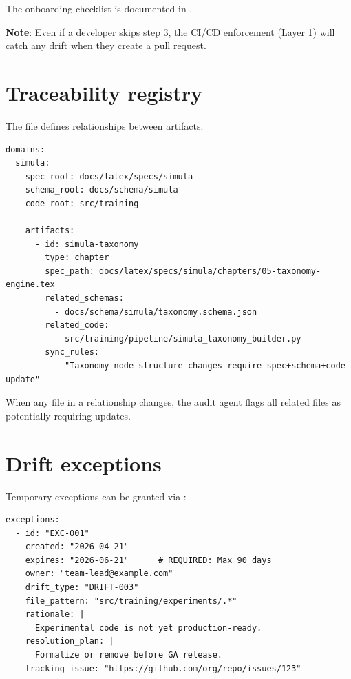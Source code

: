 The onboarding checklist is documented in .

\textbf{Note}: Even if a developer skips step 3, the CI/CD enforcement
(Layer 1) will catch any drift when they create a pull request.

\section{Traceability registry}
\label{sec:traceability}

The  file defines relationships
between artifacts:

\begin{lstlisting}[language=yamlx,caption=Example traceability mapping]
domains:
  simula:
    spec_root: docs/latex/specs/simula
    schema_root: docs/schema/simula
    code_root: src/training
    
    artifacts:
      - id: simula-taxonomy
        type: chapter
        spec_path: docs/latex/specs/simula/chapters/05-taxonomy-engine.tex
        related_schemas:
          - docs/schema/simula/taxonomy.schema.json
        related_code:
          - src/training/pipeline/simula_taxonomy_builder.py
        sync_rules:
          - "Taxonomy node structure changes require spec+schema+code update"
\end{lstlisting}

When any file in a relationship changes, the audit agent flags all related
files as potentially requiring updates.

\section{Drift exceptions}
\label{sec:exceptions}

Temporary exceptions can be granted via :

\begin{lstlisting}[language=yamlx,caption=Drift exception format]
exceptions:
  - id: "EXC-001"
    created: "2026-04-21"
    expires: "2026-06-21"      # REQUIRED: Max 90 days
    owner: "team-lead@example.com"
    drift_type: "DRIFT-003"
    file_pattern: "src/training/experiments/.*"
    rationale: |
      Experimental code is not yet production-ready.
    resolution_plan: |
      Formalize or remove before GA release.
    tracking_issue: "https://github.com/org/repo/issues/123"
\end{lstlisting}

